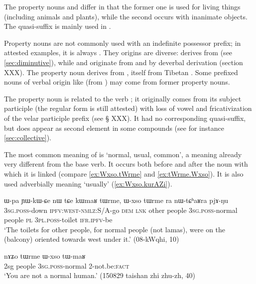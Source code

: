 The property nouns   and  differ in that the former one is used for living things (including animals and plants), while the second occurs with inanimate objects. The quasi-suffix  is mainly used in .



Property nouns are not commonly used with an indefinite possessor prefix; in attested examples, it is always . They origins are diverse:  derives from  (see \ref{sec:diminutive}), while  and   originate  from  and  by deverbal derivation (section XXX).  The property  noun  derives from , itself from Tibetan . Some  prefixed nouns of verbal origin like  (from ) may come from former property nouns.
 
The property noun  is related to the verb ; it originally comes from its subject participle (the regular form  is still attested) with loss of vowel and fricativization of the velar participle prefix (see § XXX). It had no corresponding quasi-suffix, but does appear as second element in some compounds  (see for instance \ref{sec:collective}).

The most common meaning of  is `normal, usual, common', a meaning already very different from the base verb. It occurs both before and after the noun with which it is linked (compare \ref{ex:Wxso.tWrme} and \ref{ex:tWrme.Wxso}). It is also used adverbially meaning `usually' (\ref{ex:Wxso.kurAZi}).

\begin{exe}
\ex \label{ex:Wxso.tWrme}
\gll ɯ-pa ɲɯ-kɯ-ɕe nɯ tɕe kɯmaʁ tɯrme, ɯ-xso tɯrme ra nɯ-tɕʰaʁra pjɤ-ŋu \\
\textsc{3sg.poss}-down \textsc{ipfv}:\textsc{west}-\textsc{nmlz}:S/A-go \textsc{dem} \textsc{lnk} other people \textsc{3sg.poss}-normal people \textsc{pl} \textsc{3pl.poss}-toilet \textsc{ifr.ipfv}-be \\
\glt `The toilets for other people, for normal people (not lamas), were on the (balcony) oriented towards west under it.' (08-kWqhi, 10)
\end{exe} 

\begin{exe}
\ex \label{ex:tWrme.Wxso}
\gll   nɤʑo tɯrme ɯ-xso tɯ-maʁ \\
2sg people  \textsc{3sg.poss}-normal  2-not.be:\textsc{fact} \\
\glt `You are not a normal human.' (150829 taishan zhi zhu-zh, 40)
\end{exe} 

